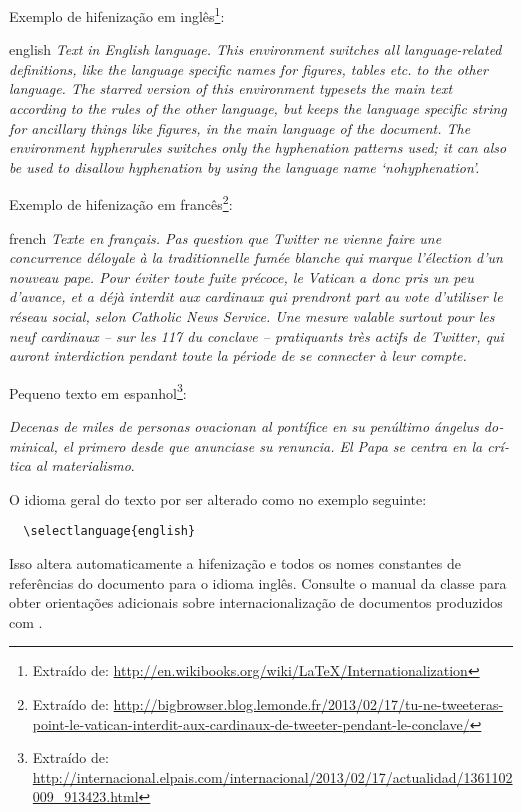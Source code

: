 \documentclass[article,12pt,oneside,a4paper,chapter=TITLE,
			   english,brazil]{abntex2}
\begin{document}
\begin{anexosenv}
Exemplo de hifenização em inglês\footnote{Extraído de: \url{http://en.wikibooks.org/wiki/LaTeX/Internationalization}}:

\begin{otherlanguage*}{english}
\textit{Text in English language. This environment switches all language-related definitions, like the language specific names for figures, tables etc. to the other language. The starred version of this environment typesets the main text according to the rules of the other language, but keeps the language specific string for ancillary things like figures, in the main language of the document. The environment hyphenrules switches only the hyphenation patterns used; it can also be used to disallow hyphenation by using the language name `nohyphenation'.}
\end{otherlanguage*}

Exemplo de hifenização em francês\footnote{Extraído de: \url{http://bigbrowser.blog.lemonde.fr/2013/02/17/tu-ne-tweeteras-point-le-vatican-interdit-aux-cardinaux-de-tweeter-pendant-le-conclave/}}:

\begin{otherlanguage*}{french}
\textit{Texte en français. Pas question que Twitter ne vienne faire une concurrence déloyale à la traditionnelle fumée blanche qui marque l'élection d'un nouveau pape. Pour éviter toute fuite précoce, le Vatican a donc pris un peu d'avance, et a déjà interdit aux cardinaux qui prendront part au vote d'utiliser le réseau social, selon Catholic News Service. Une mesure valable surtout pour les neuf cardinaux – sur les 117 du conclave – pratiquants très actifs de Twitter, qui auront interdiction pendant toute la période de se connecter à leur compte.}
\end{otherlanguage*}

Pequeno texto em espanhol\footnote{Extraído de: \url{http://internacional.elpais.com/internacional/2013/02/17/actualidad/1361102009_913423.html}}:

\foreignlanguage{spanish}{\textit{Decenas de miles de personas ovacionan al pontífice en su penúltimo ángelus dominical, el primero desde que anunciase su renuncia. El Papa se centra en la crítica al materialismo}}.

O idioma geral do texto por ser alterado como no exemplo seguinte:
\begin{verbatim}
  \selectlanguage{english}
\end{verbatim}

Isso altera automaticamente a hifenização e todos os nomes constantes de referências do documento para o idioma inglês. Consulte o manual da classe \cite{abntex2classe} para obter orientações adicionais sobre internacionalização de documentos produzidos com \abnTeX.


\end{anexosenv}
\end{document}
